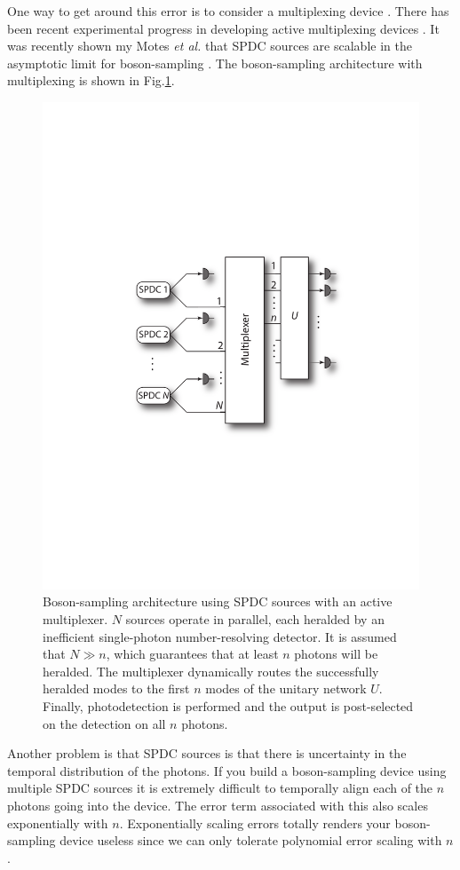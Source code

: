 \documentclass[aps,pra,twocolumn,amsmath,amssymb,nofootinbib,superscriptaddress]{revtex4}
\begin{document}
One way to get around this error is to consider a multiplexing device \cite{bib:migdall2002tailoring}. There has been recent experimental progress in developing active multiplexing devices \cite{bib:LPOR201400027, bib:ma2011experimental}. It was recently shown my Motes \emph{et al.} that SPDC sources are scalable in the asymptotic limit for boson-sampling \cite{bib:motes2013spontaneous}. The boson-sampling architecture with multiplexing is shown in Fig.\ref{fig:multiplexing}. 

\begin{figure}[!htb]
\includegraphics[width=0.7\columnwidth]{multiplexing}
\caption{Boson-sampling architecture using SPDC sources with an active multiplexer. $N$ sources operate in parallel, each heralded by an inefficient single-photon number-resolving detector. It is assumed that \mbox{$N\gg n$}, which guarantees that at least $n$ photons will be heralded. The multiplexer dynamically routes the successfully heralded modes to the first $n$ modes of the unitary network $U$. Finally, photodetection is performed and the output is post-selected on the detection on all $n$ photons.}
\label{fig:multiplexing}
\end{figure}

Another problem is that SPDC sources is that there is uncertainty in the temporal distribution of the photons. If you build a boson-sampling device using multiple SPDC sources it is extremely difficult to temporally align each of the $n$ photons going into the device. The error term associated with this also scales exponentially with $n$. Exponentially scaling errors totally renders your boson-sampling device useless since we can only tolerate polynomial error scaling with $n$. 
\end{document}
